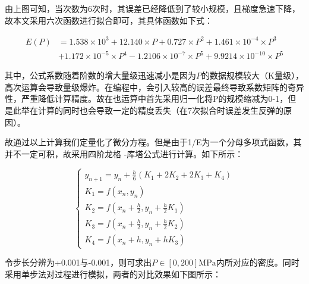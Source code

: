 \documentclass{article}
\begin{document}
由上图可知，当次数为6次时，其误差已经降低到了较小规模，且梯度急速下降，故本文采用六次函数进行拟合即可，其具体函数如下式：

\begin{equation}
	\begin{aligned}
		E(P)&=1.538\times 10^3+12.140\times P+0.727\times P^2+1.461\times 10^{-4}\times P^3\\
			&+1.172\times 10^{-5}\times P^4-1.2106\times 10^{-7}\times P^5+9.9214\times 10^{-10}\times P^5
	\end{aligned}
\end{equation}

其中，公式系数随着阶数的增大量级迅速减小是因为$P$的数据规模较大（K量级），高次运算会导致量级爆炸。在编程中，会引入较高的误差最终导致系数矩阵的奇异性，严重降低计算精度。故在也运算中首先采用归一化将P的规模缩减为0-1，但是此举在计算的同时也会导致一定的精度丢失（在7次拟合时误差发生反弹的原因）。

故通过以上计算我们定量化了微分方程。但是由于1/E为一个分母多项式函数，其并不一定可积，故采用四阶龙格 -库塔公式进行计算。如下所示：

\begin{equation}
	\left\{
		\begin{array}{ll}
			y_{n+1}=y_n+\frac{h}{6}(K_1+2K_2+2K_3+K_4)\\
			K_1=f(x_n,y_n) \\
			K_2=f(x_n+\frac{h}{2},y_n+\frac{h}{2}K_1)\\
			K_3=f(x_n+\frac{h}{2},y_n+\frac{h}{2}K_2)\\
			K_4=f(x_n+h,y_n+h K_3)
	\end{array} \right.
\end{equation}

令步长分辨为+0.001与-0.001，则可求出$P \in [0,200] \text{MPa} $内所对应的密度。同时采用单步法对过程进行模拟，两者的对比效果如下图所示：
\end{document}
